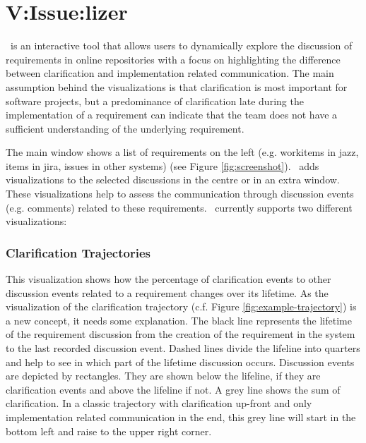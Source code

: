 \section{V:Issue:lizer}
\viss\ is an interactive tool that allows users to dynamically explore the discussion of requirements  in online repositories with a focus on highlighting the difference between clarification and implementation related communication.
The main assumption behind the visualizations is that clarification is most important for software projects, but a predominance of clarification late during the implementation of a requirement can indicate that the team does not have a sufficient understanding of the underlying requirement.

The main window shows a list of requirements on the  left (e.g. workitems in jazz, items in jira, issues in other systems) (see Figure \ref{fig:screenshot}).
\viss\ adds visualizations to the selected discussions in the centre or in an extra window. 
These visualizations help to assess the communication through discussion events (e.g. comments) related to these requirements.
%
\viss\ currently supports two different visualizations: 

\subsubsection{Clarification Trajectories} 
This visualization shows how the percentage of clarification events to other discussion events related to a requirement changes over its lifetime.
As the visualization of the clarification trajectory (c.f. Figure \ref{fig:example-trajectory}) is a new concept, it needs some explanation.
The black line represents the lifetime of the requirement discussion from the creation of the requirement in the system to the last recorded discussion event.
Dashed lines divide the lifeline into quarters and help to see in which part of the lifetime discussion occurs.
Discussion events are depicted by rectangles.
They are shown below the lifeline, if they are clarification events and above the lifeline if not.
A grey line shows the sum of clarification.
In a classic trajectory with clarification up-front and only implementation related communication in the end, this grey line will start in the bottom left and raise to the upper right corner.

